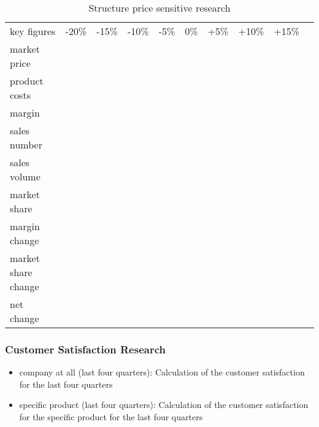        \begin{table}[ht]
        \centering
        \begin{tabular}{|l|r|r|r|r|r|r|r|r|r|}
        \hline
        key figures             & -20\% & -15\% & -10\% & -5\%  & 0\%   & +5\%  & +10\% & +15\%   \\
        market price            &       &       &       &       &       &       &       &         \\
        product costs           &       &       &       &       &       &       &       &         \\
        margin                  &       &       &       &       &       &       &       &         \\
        sales number            &       &       &       &       &       &       &       &         \\
        sales volume            &       &       &       &       &       &       &       &         \\
        market share            &       &       &       &       &       &       &       &         \\
        margin change           &       &       &       &       &       &       &       &         \\
        market share change     &       &       &       &       &       &       &       &         \\
        net change              &       &       &       &       &       &       &       &         \\
        \hline
        \end{tabular}
        \caption{Structure price sensitive research}
        \label{MR_price_sensitive}
        \end{table}

\subsubsection{Customer Satisfaction Research}
    \begin{itemize}
        \item company at all (last four quarters): Calculation of the customer satisfaction for the last four quarters 
        \item specific product (last four quarters): Calculation of the customer satisfaction for the specific product for the last four quarters 
    \end{itemize}
    
